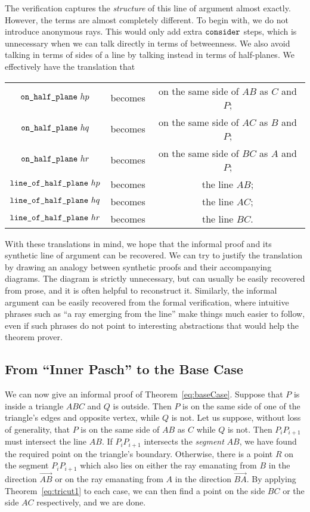 The verification captures the \emph{structure} of this line of argument almost exactly. However, the terms are almost completely different. To begin with, we do not introduce anonymous rays. This would only add extra $\texttt{consider}$ steps, which is unnecessary when we can talk directly in terms of betweenness. We also avoid talking in terms of sides of a line by talking instead in terms of half-planes. We effectively have the translation that

\begin{tabular}{ccc}
  $\texttt{on\_half\_plane}\ hp$ & becomes & on the same side of $AB$ as $C$ and $P$;\\
  $\texttt{on\_half\_plane}\ hq$ & becomes & on the same side of $AC$ as $B$ and $P$;\\
  $\texttt{on\_half\_plane}\ hr$ & becomes & on the same side of $BC$ as $A$ and $P$;\\
  $\texttt{line\_of\_half\_plane}\ hp$ & becomes & the line $AB$; \\
  $\texttt{line\_of\_half\_plane}\ hq$ & becomes & the line $AC$; \\ 
  $\texttt{line\_of\_half\_plane}\ hr$ & becomes & the line $BC$. \\
\end{tabular}

With these translations in mind, we hope that the informal proof and its synthetic line of argument can be  recovered. We can try to justify the translation by drawing an analogy between synthetic proofs and their accompanying diagrams. The diagram is strictly unnecessary, but can usually be easily recovered from prose, and it is often helpful to reconstruct it. Similarly, the informal argument can be easily recovered from the formal verification, where intuitive phrases such as ``a ray emerging from the line'' make things much easier to follow, even if such phrases do not point to interesting abstractions that would help the theorem prover.

\subsection{From ``Inner Pasch'' to the Base Case}\label{sec:JordanBaseCase1}
We can now give an informal proof of Theorem~\ref{eq:baseCase}. Suppose that $P$ is inside a triangle $ABC$ and $Q$ is outside. Then $P$ is on the same side of one of the triangle's edges and opposite vertex, while $Q$ is not. Let us suppose, without loss of generality, that $P$ is on the same side of $AB$ as $C$ while $Q$ is not. Then $P_iP_{i+1}$ must intersect the line $AB$. If $P_iP_{i+1}$ intersects the \emph{segment} $AB$, we have found the required point on the triangle's boundary. Otherwise, there is a point $R$ on the segment $P_iP_{i+1}$ which also lies on either the ray emanating from $B$ in the direction $\overrightarrow{AB}$ or on the ray emanating from $A$ in the direction $\overrightarrow{BA}$. By applying Theorem~\ref{eq:tricut1} to each case, we can then find a point on the side $BC$ or the side $AC$ respectively, and we are done.

